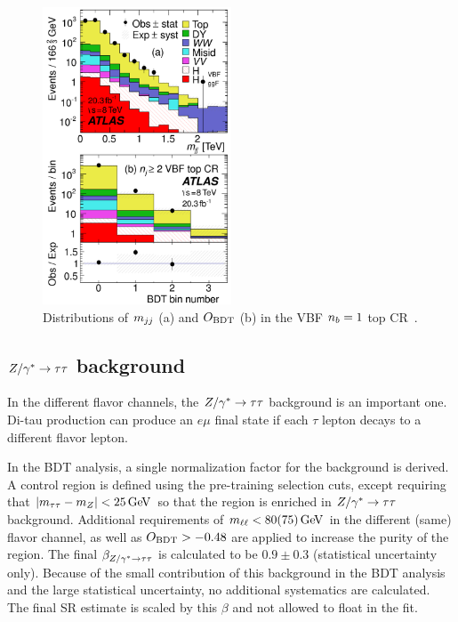 \begin{figure}[h!]
  \centering
  \captionsetup{justification=centering}
  \includegraphics[width=0.5\textwidth]{figures/VBF_topcr}
  \caption{Distributions of $m_{jj}$ (a) and $O_{\rm BDT}$ (b) in the VBF $n_b = 1$ top CR~\cite{WW2015}.}
  \label{fig:vbf_top_cr}
\end{figure}

\subsection{$Z/\gamma^{\ast} \to \tau\tau$ background}

In the different flavor channels, the $Z/\gamma^{\ast} \to \tau\tau$ background is an important one. Di-tau production can produce an $e\mu$ final state if each $\tau$ lepton decays to a different flavor lepton. 

In the BDT analysis, a single normalization factor for the background is derived. A control region is defined using the pre-training selection cuts, except requiring that $|\mtt - m_Z| < 25 \GeV$ so that the region is enriched in $Z/\gamma^{\ast} \to \tau\tau$ background. Additional requirements of $\mll < 80 (75) \GeV$ in the different (same) flavor channel, as well as $O_{\rm BDT} > -0.48$ are applied to increase the purity of the region. The final $\beta_{Z/\gamma^{\ast} \to \tau\tau}$ is calculated to be $0.9 \pm 0.3$ (statistical uncertainty only). Because of the small contribution of this background in the BDT analysis and the large statistical uncertainty, no additional systematics are calculated. The final SR estimate is scaled by this $\beta$ and not allowed to float in the fit. 

